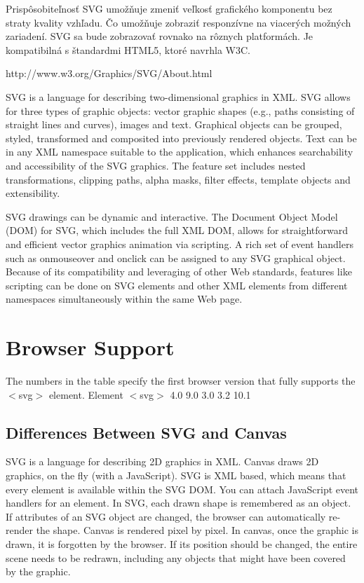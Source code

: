 Prispôsobiteľnosť SVG umožňuje zmeniť veľkosť grafického komponentu bez straty kvality vzhľadu. Čo umožňuje zobraziť responzívne na viacerých možných zariadení. 
SVG sa bude zobrazovať rovnako na rôznych platformách. Je kompatibilná s štandardmi \acs{HTML}5, ktoré navrhla \ac*{W3C}.  


http://www.w3.org/Graphics/SVG/About.html

SVG is a language for describing two-dimensional graphics in XML. SVG allows for three types of graphic objects: vector graphic shapes (e.g., paths consisting of straight lines and curves), images and text. Graphical objects can be grouped, styled, transformed and composited into previously rendered objects. Text can be in any XML namespace suitable to the application, which enhances searchability and accessibility of the SVG graphics. The feature set includes nested transformations, clipping paths, alpha masks, filter effects, template objects and extensibility.

SVG drawings can be dynamic and interactive. The Document Object Model (DOM) for SVG, which includes the full XML DOM, allows for straightforward and efficient vector graphics animation via scripting. A rich set of event handlers such as onmouseover and onclick can be assigned to any SVG graphical object. Because of its compatibility and leveraging of other Web standards, features like scripting can be done on SVG elements and other XML elements from different namespaces simultaneously within the same Web page.
 
 
 \section{Browser Support}
 The numbers in the table specify the first browser version that fully supports the $<$svg$>$ element.
 Element					
 $<$svg$>$	4.0	9.0	3.0	3.2	10.1
 \subsection{Differences Between SVG and Canvas}
 SVG is a language for describing 2D graphics in XML.
 Canvas draws 2D graphics, on the fly (with a JavaScript).
 SVG is XML based, which means that every element is available within the SVG DOM. You can attach JavaScript event handlers for an element.
 In SVG, each drawn shape is remembered as an object. If attributes of an SVG object are changed, the browser can automatically re-render the shape.
 Canvas is rendered pixel by pixel. In canvas, once the graphic is drawn, it is forgotten by the browser. If its position should be changed, the entire scene needs to be redrawn, including any objects that might have been covered by the graphic.
 
